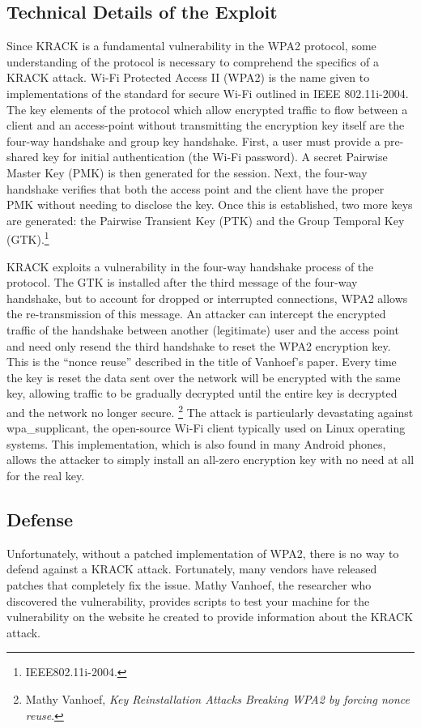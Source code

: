 \documentclass[12pt]{article}
\begin{document}
\begin{doublespace}
\section*{Technical Details of the Exploit}
Since KRACK is a fundamental vulnerability in the WPA2 protocol, some
understanding of the protocol is necessary to comprehend the specifics of
a KRACK attack. Wi-Fi Protected Access II (WPA2) is the name given to
implementations of the standard for secure Wi-Fi outlined in IEEE 802.11i-2004.
The key elements of the protocol which allow encrypted traffic to flow between
a client and an access-point without transmitting the encryption key itself
are the four-way handshake and group
key handshake. First, a user must provide a pre-shared key for initial
authentication (the Wi-Fi password). A secret Pairwise Master Key (PMK) is then
generated for the session. Next, the four-way handshake verifies that both the
access point and the client have the proper PMK without needing to disclose the
key. Once this is established, two more keys are generated: the Pairwise
Transient Key (PTK) and the Group Temporal Key (GTK).\footnote{IEEE802.11i-2004.}

KRACK exploits a vulnerability in the four-way handshake process of the
protocol. The GTK is installed after the third message of the four-way
handshake, but to account for dropped or interrupted connections, WPA2 allows
the re-transmission of this message.
An attacker can intercept the encrypted traffic of the handshake between
another (legitimate) user and the access point and
need only resend the third handshake to reset the WPA2 encryption key. This is
the ``nonce reuse'' described in the title of Vanhoef's paper. Every
time the key is reset the data sent over the network will be encrypted with
the same key, allowing traffic to be gradually decrypted until the entire
key is decrypted and the network no longer secure. \footnote{Mathy Vanhoef, \textit{Key Reinstallation Attacks Breaking WPA2 by forcing nonce reuse}.}
The attack is particularly devastating against wpa\_supplicant, the open-source
Wi-Fi client typically used on Linux operating systems. This implementation,
which is also found in many Android phones, allows the attacker to simply
install an all-zero encryption key with no need at all for the real key.\footnotemark[5]

\subsection*{Defense}
Unfortunately, without a patched implementation of WPA2, there is no way to
defend against a KRACK attack. Fortunately, many vendors have released patches
that completely fix the issue. Mathy Vanhoef, the researcher who discovered the
vulnerability, provides scripts to test your machine for the vulnerability on
the website he created to provide information about the KRACK attack.


\end{doublespace}
\end{document}
